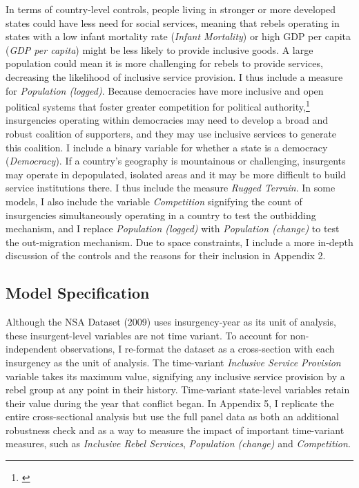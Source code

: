 \documentclass[12pt, letterpaper]{article}
\begin{document}
In terms of country-level controls, people living in stronger or more developed states could have less need for social services, meaning that rebels operating in states with a low infant mortality rate (\textit{Infant Mortality}) or high GDP per capita (\textit{GDP per capita}) might be less likely to provide inclusive goods. A large population could mean it is more challenging for rebels to provide services, decreasing the likelihood of inclusive service provision. I thus include a measure for \textit{Population (logged)}. Because democracies have more inclusive and open political systems that foster greater competition for political authority,\footnote{\citealt{mulligan2004democracies}} insurgencies operating within democracies may need to develop a broad and robust coalition of supporters, and they may use inclusive services to generate this coalition. I include a binary variable for whether a state is a democracy (\textit{Democracy}). If a country's geography is mountainous or challenging, insurgents may operate in depopulated, isolated areas and it may be more difficult to build service institutions there. I thus include the measure \textit{Rugged Terrain}. In some models, I also include the variable \textit{Competition} signifying the count of insurgencies simultaneously operating in a country to test the outbidding mechanism, and I replace \textit{Population (logged)} with \textit{Population (change)} to test the out-migration mechanism. Due to space constraints, I include a more in-depth discussion of the controls and the reasons for their inclusion in Appendix 2. 

\subsection*{Model Specification}
Although the NSA Dataset (2009) uses insurgency-year as its unit of analysis, these insurgent-level variables are not time variant. To account for non-independent observations, I re-format the dataset as a cross-section  with each insurgency as the unit of analysis. The time-variant \textit{Inclusive Service Provision} variable takes its maximum value, signifying any inclusive service provision by a rebel group at any point in their history. Time-variant state-level variables retain their value during the year that conflict began. In Appendix 5, I replicate the entire cross-sectional analysis but use the full panel data as both an additional robustness check and as a way to measure the impact of important time-variant measures, such as \textit{Inclusive Rebel Services}, \textit{Population (change)} and \textit{Competition}.
\end{document}
